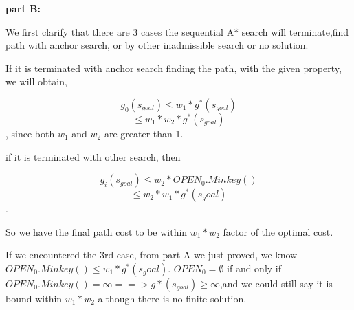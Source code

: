\documentclass[12pt, letterpaper]{article}
\begin{document}
\textbf{part B:}

\noindent We first clarify that there are 3 cases the sequential A* search will terminate,find path with anchor search, or by other inadmissible search or no solution.
 
\medskip

\noindent If it is terminated with anchor search finding the path, with the given property, we will obtain,

$$g_0(s_{goal}) \leq w_1 * g^*(s_{goal})$$
$$\leq w_1 * w_2 * g^*(s_{goal})$$, since both $ w_1 $ and $ w_2 $ are greater than 1.

\medskip

\noindent if it is terminated with other search, then

$$g_i(s_{goal}) \leq w_2 * OPEN_0.Minkey()$$
$$\leq w_2*w_1*g^*(s_goal)$$.

So we have the final path cost to be within $ w_1*w_2 $ factor of the optimal cost.

If we encountered the 3rd case, from part A we just proved, we know $ OPEN_0.Minkey() \leq w_1 * g^*(s_goal) $. $OPEN_0=\emptyset$ if and only if $OPEN_0.Minkey() = \infty ==> g*(s_{goal}) \geq \infty$,and we could still say it is bound within $ w_1*w_2 $ although there is no finite solution. 
\end{document}

